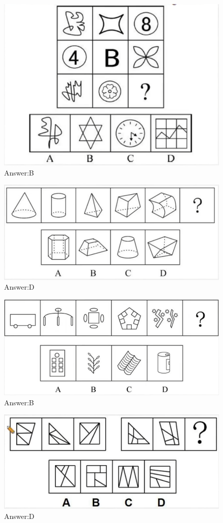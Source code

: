 \documentclass{article}
\numberwithin{equation}{section}						%
\numberwithin{figure}{section}							%
\begin{document}
\begin{sloppypar}
\begin{figure}[H]
     \centering
     \includegraphics[width=0.6\linewidth]{73.png}
		\caption{Answer:B}
\end{figure}

\begin{figure}[H]
     \centering
     \includegraphics[width=0.6\linewidth]{74.png}
		\caption{Answer:D}
\end{figure}

\begin{figure}[H]
     \centering
     \includegraphics[width=0.6\linewidth]{75.png}
		\caption{Answer:B}
\end{figure}


\begin{figure}[H]
     \centering
     \includegraphics[width=0.6\linewidth]{76.png}
		\caption{Answer:D}
\end{figure}


\end{sloppypar}
\end{document}
